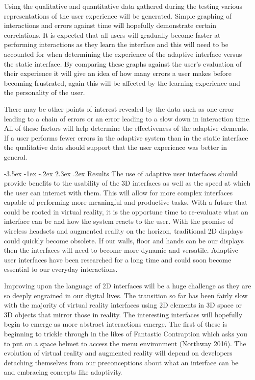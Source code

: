 \documentclass[11pt]{article}
\makeatletter
\renewcommand{\section}{\@startsection {section}{1}{\z@}%
             {-3.5ex \@plus -1ex \@minus -.2ex}%
             {2.3ex \@plus .2ex}%
             {\normalfont\Large\scshape\bfseries}}
\makeatother
\begin{document}
Using the qualitative and quantitative data gathered during the testing various representations of the user experience will be generated. Simple graphing of interactions and errors against time will hopefully demonstrate certain correlations. It is expected that all users will gradually become faster at performing interactions as they learn the interface and this will need to be accounted for when determining the experience of the adaptive interface versus the static interface. By comparing these graphs against the user's evaluation of their experience it will give an idea of how many errors a user makes before becoming frustrated, again this will be affected by the learning experience and the personality of the user. 

There may be other points of interest revealed by the data such as one error leading to a chain of errors or an error leading to a slow down in interaction time. All of these factors will help determine the effectiveness of the adaptive elements. If a user performs fewer errors in the adaptive system than in the static interface the qualitative data should support that the user experience was better in general.

\section{Results}
The use of adaptive user interfaces should provide benefits to the usability of the 3D interfaces as well as the speed at which the user can interact with them. This will allow for more complex interfaces capable of performing more meaningful and productive tasks. With a future that could be rooted in virtual reality, it is the opportune time to re-evaluate what an interface can be and how the system reacts to the user. With the promise of wireless headsets and augmented reality on the horizon, traditional 2D displays could quickly become obsolete. If our walls, floor and hands can be our displays then the interfaces will need to become more dynamic and versatile. Adaptive user interfaces have been researched for a long time and could soon become essential to our everyday interactions.

Improving upon the language of 2D interfaces will be a huge challenge as they are so deeply engrained in our digital lives. The transition so far has been fairly slow with the majority of virtual reality interfaces using 2D elements in 3D space or 3D objects that mirror those in reality. The interesting interfaces will hopefully begin to emerge as more abstract interactions emerge. The first of these is beginning to trickle through in the likes of Fantastic Contraption which asks you to put on a space helmet to access the menu environment (Northway 2016). The evolution of virtual reality and augmented reality will depend on developers detaching themselves from our preconceptions about what an interface can be and embracing concepts like adaptivity.
\end{document}
